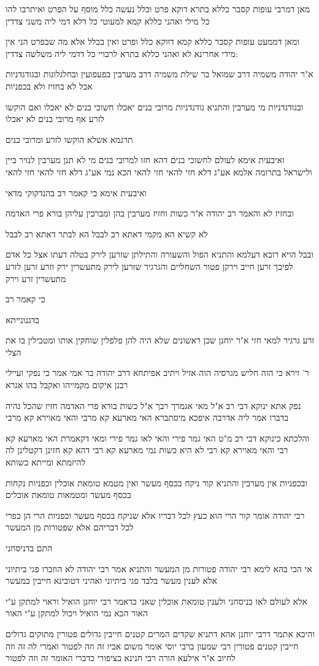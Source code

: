 \documentclass[12pt, openany]{book}
\newcommand{\sethebfont}{
\fontsize{10.5pt}{21.0pt} \selectfont
}
\newcommand{\textblock}[1]{
{\sethebfont #1\\}	
}
\begin{document}
\textblock{מאן דמרבי עופות קסבר כללא בתרא דוקא פרט וכלל נעשה כלל מוסף על הפרט ואיתרבו להו כל מילי ואהני כללא קמא למעוטי כל דלא דמי ליה משני צדדין}
\textblock{ומאן דממעט עופות קסבר כללא קמא דווקא כלל ופרט ואין בכלל אלא מה שבפרט הני אין מידי אחרינא לא ואהני כללא בתרא לרבויי כל דדמי ליה משלשה צדדין:}
\textblock{א"ר יהודה משמיה דרב שמואל בר שילת משמיה דרב מערבין בפעפועין ובחלגלוגות ובגודגדניות אבל לא בחזיז ולא בכפניות}
\textblock{ובגודגדניות מי מערבין והתניא גודגדניות מרובי בנים יאכלו חשוכי בנים לא יאכלו ואם הוקשו לזרע אף מרובי בנים לא יאכלו}
\textblock{תרגמא אשלא הוקשו לזרע ומרובי בנים}
\textblock{ואיבעית אימא לעולם לחשוכי בנים דהא חזו למרובי בנים מי לא תנן מערבין לנזיר ביין ולישראל בתרומה אלמא אע"ג דלא חזי להאי חזי להאי הכא נמי אע"ג דלא חזי להאי חזי להאי}
\textblock{ואיבעית אימא כי קאמר רב בהנדקוקי מדאי}
\textblock{ובחזיז לא והאמר רב יהודה א"ר כשות וחזיז מערבין בהן ומברכין עליהן בורא פרי האדמה}
\textblock{לא קשיא הא מקמי דאתא רב לבבל הא לבתר דאתא רב לבבל}
\textblock{ובבל הויא רובא דעלמא והתניא הפול והשעורה והתילתן שזרען לירק בטלה דעתו אצל כל אדם לפיכך זרען חייב וירקן פטור השחליים והגרגיר שזרען לירק מתעשרין ירק וזרע זרען לזרע מתעשרין זרע וירק}
\textblock{כי קאמר רב}
\textblock{בדגנונייתא}
\textblock{זרע גרגיר למאי חזי א"ר יוחנן שכן ראשונים שלא היה להן פלפלין שוחקין אותו ומטבילין בו את הצלי}
\textblock{ר' זירא כי הוה חליש מגרסיה הוה אזיל ויתיב אפיתחא דרב יהודה בר אמי אמר כי נפקי ועיילי רבנן איקום מקמייהו ואקבל בהו אגרא}
\textblock{נפק אתא ינוקא דבי רב א"ל מאי אגמרך רבך א"ל כשות בורא פרי האדמה חזיז שהכל נהיה בדברו אמר ליה אדרבה איפכא מיסתברא האי מארעא קא מרבי והאי מאוירא קא מרבי}
\textblock{והלכתא כינוקא דבי רב מ"ט האי גמר פירי והאי לאו גמר פירי ומאי דקאמרת האי מארעא קא רבי והאי מאוירא קא רבי לא היא כשות נמי מארעא קא רבי דהא קא חזינן דקטלינן לה להיזמתא ומייתא כשותא}
\textblock{ובכפניות אין מערבין והתניא קור ניקח בכסף מעשר ואין מטמא טומאת אוכלין וכפניות נקחות בכסף מעשר ומטמאות טומאת אוכלים}
\textblock{רבי יהודה אומר קור הרי הוא כעץ לכל דבריו אלא שניקח בכסף מעשר וכפניות הרי הן כפרי לכל דבריהם אלא שפטורות מן המעשר}
\textblock{התם בדניסחני}
\textblock{אי הכי בהא לימא רבי יהודה פטורות מן המעשר והתניא אמר רבי יהודה לא הוזכרו פגי ביתיוני אלא לענין מעשר בלבד פגי ביתיוני ואהיני דטובינא חייבין במעשר}
\textblock{אלא לעולם לאו בניסחני ולענין טומאת אוכלין שאני כדאמר רבי יוחנן הואיל וראוי למתקן ע"י האור הכא נמי הואיל ויכול למתקן ע"י האור}
\textblock{והיכא אתמר דרבי יוחנן אהא דתניא שקדים המרים קטנים חייבין גדולים פטורין מתוקים גדולים חייבין קטנים פטורין רבי שמעון ברבי יוסי אומר משום אביו זה וזה לפטור ואמרי לה זה וזה לחיוב א"ר אילעא הורה רבי חנינא בציפורי כדברי האומר זה וזה לפטור}
\end{document}
